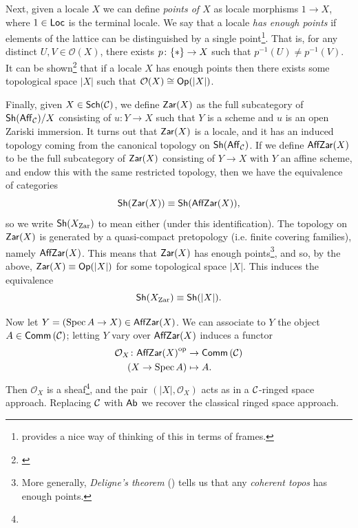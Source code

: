         Next, given a locale $X$ we can define \emph{points of $X$} as locale morphisms $1\to X$, where $1\in\mathsf{Loc}$ is the terminal locale.
        We say that a locale \emph{has enough points} if elements of the lattice can be distinguished by a single point\footnote{
            \Cite[\S IX.2]{MacLane:1992uz} provides a nice way of thinking of this in terms of frames.
        }.
        That is, for any distinct $U,V\in\mathcal{O}(X)$, there exists $p\colon\{*\}\to X$ such that $p^{-1}(U)\neq p^{-1}(V)$.
        It can be shown\footnote{
            \cite[Corollary~4,~\S IX.3]{MacLane:1992uz}
        } that if a locale $X$ has enough points then there exists some topological space $|X|$ such that $\mathcal{O}(X)\cong\mathsf{Op}(|X|)$.

        Finally, given $X\in\mathsf{Sch}(\mathcal{C})$, we define $\mathsf{Zar}(X)$ as the full subcategory of $\mathsf{Sh}(\mathsf{Aff}_{\mathcal{C}})/X$ consisting of $u\colon Y\to X$ such that $Y$ is a scheme and $u$ is an open Zariski immersion.
        It turns out that $\mathsf{Zar}(X)$ is a locale, and it has an induced topology coming from the canonical topology on $\mathsf{Sh}(\mathsf{Aff}_{\mathcal{C}})$.
        If we define $\mathsf{AffZar}(X)$ to be the full subcategory of $\mathsf{Zar}(X)$ consisting of $Y\to X$ with $Y$ an affine scheme, and endow this with the same restricted topology, then we have the equivalence of categories
        \begin{equation*}
            \mathsf{Sh}(\mathsf{Zar}(X))\equiv\mathsf{Sh}(\mathsf{AffZar}(X)),
        \end{equation*}
        so we write $\mathsf{Sh}(X_\text{Zar})$ to mean either (under this identification).
        The topology on $\mathsf{Zar}(X)$ is generated by a quasi-compact pretopology (i.e. finite covering families), namely $\mathsf{AffZar}(X)$.
        This means that $\mathsf{Zar}(X)$ has enough points\footnote{
            More generally, \emph{Deligne's theorem} (\cite[Corollary~3,~\S IX.11]{MacLane:1992uz}) tells us that any \emph{coherent topos} has enough points.
        }, and so, by the above, $\mathsf{Zar}(X)\equiv\mathsf{Op}(|X|)$ for some topological space $|X|$.
        This induces the equivalence
        \begin{equation*}
            \mathsf{Sh}(X_\text{Zar})\equiv\mathsf{Sh}(|X|).
        \end{equation*}

        \bigskip

        Now let $Y=(\operatorname{Spec} A\to X)\in\mathsf{AffZar}(X)$.
        We can associate to $Y$ the object $A\in\mathsf{Comm}\left({\mathcal{C}}\right)$; letting $Y$ vary over $\mathsf{AffZar}(X)$ induces a functor
        \begin{align*}
            \mathcal{O}_X\colon{\mathsf{AffZar}(X)}^{\mathrm{op}}&\to\mathsf{Comm}\left({\mathcal{C}}\right)\\
            (X\to\operatorname{Spec} A)&\mapsto A.
        \end{align*}
        Then $\mathcal{O}_X$ is a sheaf\footnote{
        }, and the pair $(|X|,\mathcal{O}_X)$ acts as in a $\mathcal{C}$-ringed space approach.
        Replacing $\mathcal{C}$ with $\mathsf{Ab}$ we recover the classical ringed space approach.

